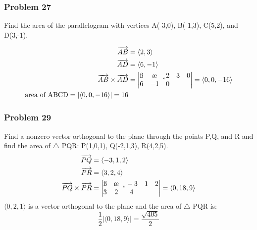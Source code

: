 \documentclass[letterpaper, 12pt]{math}
\begin{document}
\subsubsection*{Problem 27}
Find the area of the parallelogram with vertices A(-3,0), B(-1,3), C(5,2), and
D(3,-1).
\begin{center}
\end{center}
\begin{align*}
  \overrightarrow{AB} &= \langle2,3\rangle \\
  \overrightarrow{AD} &= \langle6,-1\rangle \\
  \overrightarrow{AB}\times\overrightarrow{AD} &= \begin{vmatrix}
    \i & \j & \k \\
    2 & 3 & 0 \\
    6 & -1 & 0 \\
  \end{vmatrix} = \langle0,0,-16\rangle \\
  \text{area of ABCD} = |\langle0,0,-16\rangle| = 16
\end{align*}

\subsubsection*{Problem 29}
Find a nonzero vector orthogonal to the plane through the points P,Q, and R and
find the area of \( \triangle \) PQR: P(1,0,1), Q(-2,1,3), R(4,2,5).
\begin{align*}
  \overrightarrow{PQ} &= \langle-3,1,2\rangle \\
  \overrightarrow{PR} &= \langle3,2,4\rangle \\
  \overrightarrow{PQ}\times\overrightarrow{PR} &= \begin{vmatrix}
    \i & \j & \k \\
    -3 & 1 & 2 \\
    3 & 2 & 4
  \end{vmatrix} = \langle0,18,9\rangle
\end{align*}
\( \langle0,2,1\rangle \) is a vector orthogonal to the plane and the area of
\( \triangle \) PQR is:
\[ \frac{1}{2}|\langle0,18,9\rangle| = \frac{\sqrt{405}}{2} \]
\end{document}
